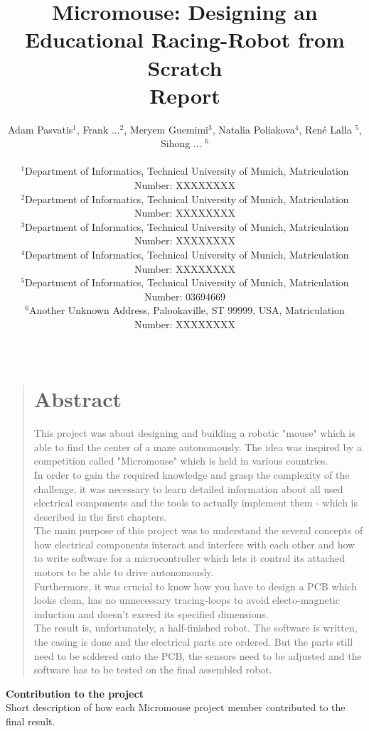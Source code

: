 \documentclass[12pt]{article}
\title{Micromouse: Designing an Educational Racing-Robot from Scratch \\Report}
\author
{Adam Pasvatis$^{1}$, Frank ...$^{2}$, Meryem Guemimi$^{3}$, Natalia Poliakova$^{4}$, René Lalla $^{5}$, Sihong ... $^{6}$\\
\\
\normalsize{$^{1}$Department of Informatics, Technical University of Munich, Matriculation Number: XXXXXXXX}\\
\normalsize{$^{2}$Department of Informatics, Technical University of Munich, Matriculation Number: XXXXXXXX}\\
\normalsize{$^{3}$Department of Informatics, Technical University of Munich, Matriculation Number: XXXXXXXX}\\
\normalsize{$^{4}$Department of Informatics, Technical University of Munich, Matriculation Number: XXXXXXXX}\\
\normalsize{$^{5}$Department of Informatics, Technical University of Munich, Matriculation Number: 03694669}\\
\normalsize{$^{6}$Another Unknown Address, Palookaville, ST 99999, USA, Matriculation Number: XXXXXXXX}\\
\\
}
\date{}
\newenvironment{sciabstract}{%
\begin{quote} \bf}
{\end{quote}}
\begin{document}

\baselineskip24pt


\maketitle

\newpage

\begin{sciabstract}
  \section*{Abstract}
    This project was about designing and building a robotic "mouse" which is able to find the center of a maze autonomously. The idea was inspired by a competition called "Micromouse" which is held in various countries.\\
    In order to gain the required knowledge and grasp the complexity of the challenge, it was necessary to learn detailed information about all used electrical components and the tools to actually implement them - which is described in the first chapters.\\
    The main purpose of this project was to understand the several concepts of how electrical components interact and interfere with each other and how to write software for a microcontroller which lets it control its attached motors to be able to drive autonomously.\\
    Furthermore, it was crucial to know how you have to design a PCB which looks clean, has no unnecessary tracing-loops to avoid electo-magnetic induction and doesn't exceed its specified dimensions.\\

    \noindent
    The result is, unfortunately, a half-finished robot. The software is written, the casing is done and the electrical parts are ordered. But the parts still need to be soldered onto the PCB, the sensors need to be adjusted and the software has to be tested on the final assembled robot.\\

\end{sciabstract}

\newpage

\Large \textbf{Contribution to the project}\\

\normalsize Short description of how each Micromouse project member contributed to the final result.
\end{document}
